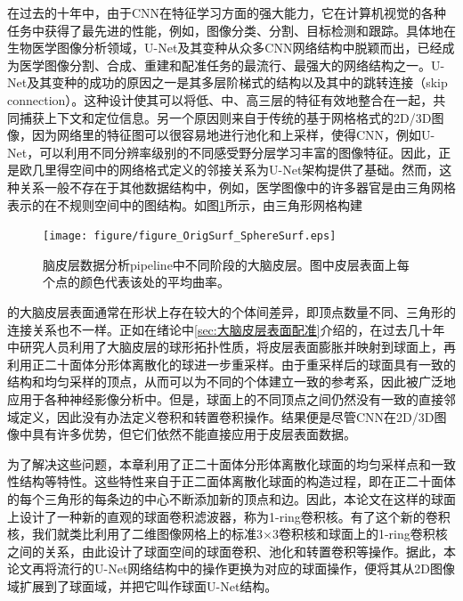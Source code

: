 在过去的十年中，由于CNN在特征学习方面的强大能力，它在计算机视觉的各种任务中获得了最先进的性能，例如，图像分类\cite{krizhevsky2012imagenet}、分割\cite{long2015fully}、目标检测和跟踪\cite{ren2015faster}。具体地在生物医学图像分析领域，U-Net\cite{ronneberger2015u}及其变种从众多CNN网络结构中脱颖而出，已经成为医学图像分割\cite{cciccek20163d}、合成\cite{nie2016estimating}、重建\cite{xiang2018ultra}和配准\cite{balakrishnan2018unsupervised}任务的最流行、最强大的网络结构之一。U-Net及其变种的成功的原因之一是其多层阶梯式的结构以及其中的跳转连接（skip connection）。这种设计使其可以将低、中、高三层的特征有效地整合在一起，共同捕获上下文和定位信息。另一个原因则来自于传统的基于网格格式的2D/3D图像，因为网络里的特征图可以很容易地进行池化和上采样，使得CNN，例如U-Net，可以利用不同分辨率级别的不同感受野分层学习丰富的图像特征。因此，正是欧几里得空间中的网络格式定义的邻接关系为U-Net架构提供了基础。然而，这种关系一般不存在于其他数据结构中，例如，医学图像中的许多器官是由三角网格表示的在不规则空间中的图结构。如图\ref{fig:figure_OrigSurf_SphereSurf}所示，由三角形网格\cite{dale1999cortical}构建\begin{figure}[h]
    \centering
    \texttt{[image: figure/figure\_OrigSurf\_SphereSurf.eps]}
    \caption{\label{fig:figure_OrigSurf_SphereSurf}脑皮层数据分析pipeline中不同阶段的大脑皮层。图中皮层表面上每个点的颜色代表该处的平均曲率。}
\end{figure}的大脑皮层表面通常在形状上存在较大的个体间差异，即顶点数量不同、三角形的连接关系也不一样。正如在绪论中\ref{sec:大脑皮层表面配准}介绍的，在过去几十年中研究人员利用了大脑皮层的球形拓扑性质，将皮层表面膨胀并映射到球面上\cite{fischl2012freesurfer}，再利用正二十面体分形体离散化的球\cite{fischl1999cortical}进一步重采样。由于重采样后的球面具有一致的结构和均匀采样的顶点，从而可以为不同的个体建立一致的参考系，因此被广泛地应用于各种神经影像分析中\cite{li2019computational,glasser2013minimal}。但是，球面上的不同顶点之间仍然没有一致的直接邻域定义，因此没有办法定义卷积和转置卷积操作。结果便是尽管CNN在2D/3D图像中具有许多优势，但它们依然不能直接应用于皮层表面数据。

为了解决这些问题，本章利用了正二十面体分形体离散化球面的均匀采样点和一致性结构等特性。这些特性来自于正二面体离散化球面的构造过程，即在正二十面体的每个三角形的每条边的中心不断添加新的顶点和边\cite{fischl2012freesurfer}。因此，本论文在这样的球面上设计了一种新的直观的球面卷积滤波器，称为1-ring卷积核。有了这个新的卷积核，我们就类比利用了二维图像网格上的标准3$\times$3卷积核和球面上的1-ring卷积核之间的关系，由此设计了球面空间的球面卷积、池化和转置卷积等操作。据此，本论文再将流行的U-Net网络结构中的操作更换为对应的球面操作，便将其从2D图像域扩展到了球面域，并把它叫作球面U-Net结构。


